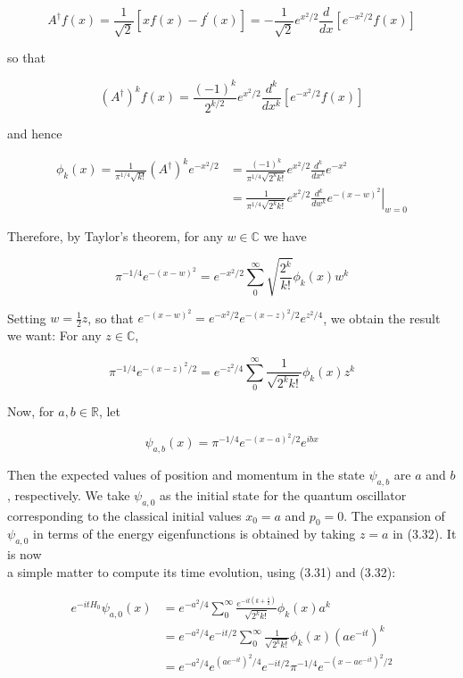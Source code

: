 \documentclass[10pt, letterpaper]{article}
\begin{document}
$$
A^{\dagger} f(x)=\frac{1}{\sqrt{2}}\left[x f(x)-f^{\prime}(x)\right]=-\frac{1}{\sqrt{2}} e^{x^{2} / 2} \frac{d}{d x}\left[e^{-x^{2} / 2} f(x)\right]
$$

so that

$$
\left(A^{\dagger}\right)^{k} f(x)=\frac{(-1)^{k}}{2^{k / 2}} e^{x^{2} / 2} \frac{d^{k}}{d x^{k}}\left[e^{-x^{2} / 2} f(x)\right]
$$

and hence

$$
\begin{aligned}
\phi_{k}(x)=\frac{1}{\pi^{1 / 4} \sqrt{k!}}\left(A^{\dagger}\right)^{k} e^{-x^{2} / 2} & =\frac{(-1)^{k}}{\pi^{1 / 4} \sqrt{2^{k} k!}} e^{x^{2} / 2} \frac{d^{k}}{d x^{k}} e^{-x^{2}} \\
& =\left.\frac{1}{\pi^{1 / 4} \sqrt{2^{k} k!}} e^{x^{2} / 2} \frac{d^{k}}{d w^{k}} e^{-(x-w)^{2}}\right|_{w=0}
\end{aligned}
$$

Therefore, by Taylor's theorem, for any $w \in \mathbb{C}$ we have

$$
\pi^{-1 / 4} e^{-(x-w)^{2}}=e^{-x^{2} / 2} \sum_{0}^{\infty} \sqrt{\frac{2^{k}}{k!}} \phi_{k}(x) w^{k}
$$

Setting $w=\frac{1}{2} z$, so that $e^{-(x-w)^{2}}=e^{-x^{2} / 2} e^{-(x-z)^{2} / 2} e^{z^{2} / 4}$, we obtain the result we want: For any $z \in \mathbb{C}$,

$$
\pi^{-1 / 4} e^{-(x-z)^{2} / 2}=e^{-z^{2} / 4} \sum_{0}^{\infty} \frac{1}{\sqrt{2^{k} k!}} \phi_{k}(x) z^{k}
$$

Now, for $a, b \in \mathbb{R}$, let

$$
\psi_{a, b}(x)=\pi^{-1 / 4} e^{-(x-a)^{2} / 2} e^{i b x}
$$

Then the expected values of position and momentum in the state $\psi_{a, b}$ are $a$ and $b$, respectively. We take $\psi_{a, 0}$ as the initial state for the quantum oscillator corresponding to the classical initial values $x_{0}=a$ and $p_{0}=0$. The expansion of $\psi_{a, 0}$ in terms of the energy eigenfunctions is obtained by taking $z=a$ in (3.32). It is now\\
a simple matter to compute its time evolution, using (3.31) and (3.32):

$$
\begin{aligned}
e^{-i t H_{0}} \psi_{a, 0}(x) & =e^{-a^{2} / 4} \sum_{0}^{\infty} \frac{e^{-i t\left(k+\frac{1}{2}\right)}}{\sqrt{2^{k} k!}} \phi_{k}(x) a^{k} \\
& =e^{-a^{2} / 4} e^{-i t / 2} \sum_{0}^{\infty} \frac{1}{\sqrt{2^{k} k!}} \phi_{k}(x)\left(a e^{-i t}\right)^{k} \\
& =e^{-a^{2} / 4} e^{\left(a e^{-i t}\right)^{2} / 4} e^{-i t / 2} \pi^{-1 / 4} e^{-\left(x-a e^{-i t}\right)^{2} / 2}
\end{aligned}
$$
\end{document}
